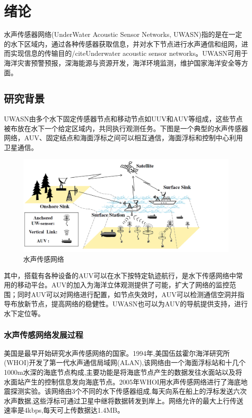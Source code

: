\chapter{绪论}
水声传感器网络(UnderWater Acoustic Sensor Networks, UWASN)指的是在一定的水下区域内，通过各种传感器获取信息，并对水下节点进行水声通信和组网，进而实现信息的传输目的/cite{Underwater acoustic sensor networks}。UWASN可用于海洋灾害预警预报，深海能源与资源开发，海洋环境监测，维护国家海洋安全等方面。


\section{研究背景}
UWASN由多个水下固定传感器节点和移动节点如UUV和AUV等组成，这些节点被布放在水下一个给定区域内，共同执行观测任务。下图是一个典型的水声传感器网络，AUV、固定结点和海面浮标之间可以相互通信，海面浮标和控制中心利用卫星通信。
\begin{figure}[ht]
	\centering
	\includegraphics[scale=0.25]{figures/1.png}
	\caption{
		水声传感网络
	}
	\label{fig:example}
\end{figure}

其中，搭载有各种设备的AUV可以在水下按特定轨迹航行，是水下传感网络中常用的移动平台。AUV的加入为海洋立体观测提供了可能，扩大了网络的监控范围；同时AUV可以对网络进行配置，如节点失效时，AUV可以检测通信空洞并指导布放新节点，提高网络的稳健性。UWASN也可以为AUV的导航提供支持，进行水下定位等。

\subsection{水声传感网络发展过程}
美国是最早开始研究水声传感网络的国家。1994年,美国伍兹霍尔海洋研究所(WHOI)开发了第一代水声通信局域网(ALAN),该网络由一个海面浮标站和十几个1000m水深的海底节点构成,主要功能是将海底节点产生的数据发往水面站以及将水面站产生的控制信息发向海底节点。2005年WHOI用水声传感网络进行了海底地震探测实验。该网络由3个不同的水下传感器组成,每天向系在船上的浮标发送六次水声数据,这些浮标可通过卫星中继将数据转发到岸上。网络允许的最大上行传送速率是4kbps,每天可上传数据达1.4MB。

